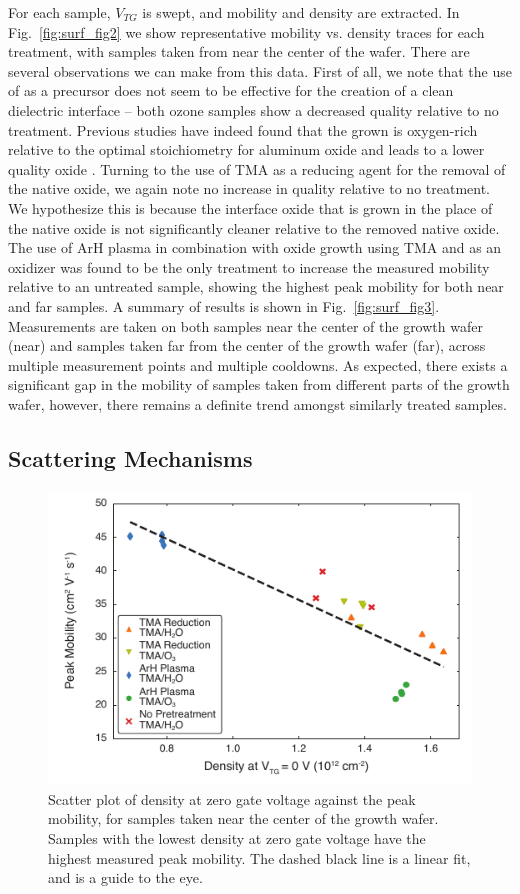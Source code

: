 For each sample, $V_{TG}$ is swept, and mobility and density are extracted. In Fig.~\ref{fig:surf_fig2} we show representative mobility vs. density traces for each treatment, with samples taken from near the center of the wafer. There are several observations we can make from this data. First of all, we note that the use of  as a precursor does not seem to be effective for the creation of a clean dielectric interface -- both ozone samples show a decreased quality relative to no treatment. Previous studies have indeed found that the  grown is oxygen-rich relative to the optimal stoichiometry for aluminum oxide and leads to a lower quality oxide \cite{ingaas_redux,10.1021/cm0608903}. Turning to the use of TMA as a reducing agent for the removal of the native oxide, we again note no increase in quality relative to no treatment. We hypothesize this is because the interface oxide that is grown in the place of the native oxide is not significantly cleaner relative to the removed native oxide. The use of ArH plasma in combination with oxide growth using TMA and  as an oxidizer was found to be the only treatment to increase the measured mobility relative to an untreated sample, showing the highest peak mobility for both near and far samples. A summary of results is shown in Fig.~\ref{fig:surf_fig3}. Measurements are taken on both samples near the center of the growth wafer (near) and samples taken far from the center of the growth wafer (far), across multiple measurement points and multiple cooldowns. As expected, there exists a significant gap in the mobility of samples taken from different parts of the growth wafer, however, there remains a definite trend amongst similarly treated samples.

\subsection{\label{sec:surf_scat}Scattering Mechanisms}

\begin{figure}
    \includegraphics[width=0.6\linewidth]{Figure4}
    \caption[Peak mobilities against density at zero gate voltage]{\label{fig:surf_fig4}Scatter plot of density at zero gate voltage against the peak mobility, for samples taken near the center of the growth wafer. Samples with the lowest density at zero gate voltage have the highest measured peak mobility. The dashed black line is a linear fit, and is a guide to the eye.}
\end{figure}


